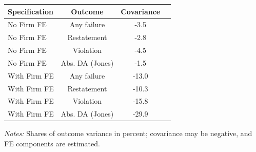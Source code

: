 \documentclass[10pt]{article}
\begin{document}
\begin{minipage}{19cm}\fontsize{10}{12}\selectfont\setlength{\tabcolsep}{4pt}\renewcommand{\arraystretch}{1.12}


\centering
{}
\begin{threeparttable}
\begin{tabular}{p{}ccc}
\toprule
Specification & Outcome & Covariance &  \\
\midrule
No Firm FE & Any failure & -3.5 &  \\
No Firm FE & Restatement & -2.8 &  \\
No Firm FE & Violation & -4.5 &  \\
No Firm FE & Abs. DA (Jones) & -1.5 &  \\
With Firm FE & Any failure & -13.0 &  \\
With Firm FE & Restatement & -10.3 &  \\
With Firm FE & Violation & -15.8 &  \\
With Firm FE & Abs. DA (Jones) & -29.9 &  \\
\bottomrule
\end{tabular}
\begin{tablenotes}\fontsize{9}{11}\selectfont
\item \raggedright \fontsize{9}{11}\selectfont \textit{Notes:} Shares of outcome variance in percent; covariance may be negative, and FE components are estimated.
\end{tablenotes}
\end{threeparttable}

\end{minipage}
\end{document}
